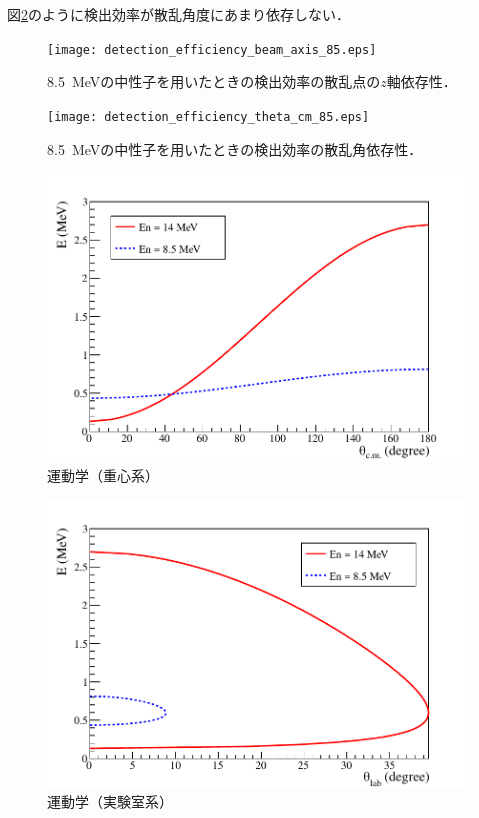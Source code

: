\documentclass[../master]{subfiles}
\begin{document}
図\ref{fig::detection_efficiency_theta_cm_low}のように検出効率が散乱角度にあまり依存しない．
\begin{figure}
  \centering
  \texttt{[image: detection\_efficiency\_beam\_axis\_85.eps]}
  \caption{\SI{8.5}{\mega\electronvolt}の中性子を用いたときの検出効率の散乱点の$z$軸依存性．}
  \label{fig::detection_efficiency_beam_axis_low}
\end{figure}
\begin{figure}
  \centering
  \texttt{[image: detection\_efficiency\_theta\_cm\_85.eps]}
  \caption{\SI{8.5}{\mega\electronvolt}の中性子を用いたときの検出効率の散乱角依存性．}
  \label{fig::detection_efficiency_theta_cm_low}
\end{figure}
\begin{figure}
  \centering
  \includegraphics[clip, width=0.8\columnwidth]{../pdf/kinema_cm.pdf}
  \caption{運動学（重心系）}
  \label{fig::kinema_cm}
\end{figure}
\begin{figure}
  \centering
  \includegraphics[clip, width=0.8\columnwidth]{../pdf/kinema_lab.pdf}
  \caption{運動学（実験室系）}
  \label{fig::kinema_lab}
\end{figure}
\end{document}
